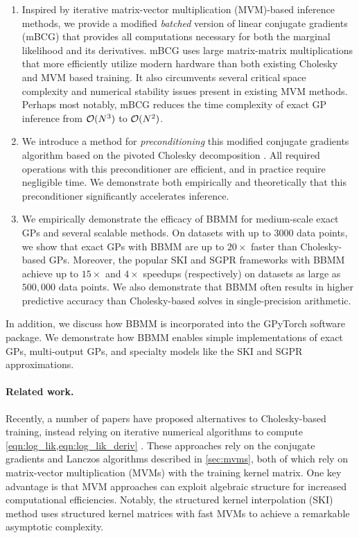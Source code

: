 \begin{enumerate}
	\item Inspired by iterative matrix-vector multiplication (MVM)-based inference methods, we provide a modified \emph{batched} version of linear conjugate gradients (mBCG) that provides all computations necessary for both the marginal likelihood and its derivatives.
		mBCG uses large matrix-matrix multiplications that more efficiently utilize modern hardware than both existing Cholesky and MVM based training.
		It also circumvents several critical space complexity and numerical stability issues present in existing MVM methods.
		Perhaps most notably, mBCG reduces the time complexity of exact GP inference from $\bigo{N^3}$ to $\bigo{N^2}$.

	\item We introduce a method for \emph{preconditioning} this modified conjugate gradients algorithm based on the pivoted Cholesky decomposition \cite{bach2013sharp,harbrecht2012low}.
		All required operations with this preconditioner are efficient, and in practice require negligible time.
		We demonstrate both empirically and theoretically that this preconditioner significantly accelerates inference.

	\item We empirically demonstrate the efficacy of BBMM for medium-scale exact GPs and several scalable methods.
		On datasets with up to $3000$ data points, we show that exact GPs with BBMM are up to $20\times$ faster than Cholesky-based GPs.
		Moreover, the popular SKI \cite{wilson2015kernel} and SGPR \cite{titsias2009variational} frameworks with BBMM achieve up to $15\times$ and $4\times$ speedups (respectively) on datasets as large as $500,\!000$ data points.
		We also demonstrate that BBMM often results in higher predictive accuracy than Cholesky-based solves in single-precision arithmetic.
\end{enumerate}
%
\noindent
In addition, we discuss how BBMM is incorporated into the GPyTorch software package.
We demonstrate how BBMM enables simple implementations of exact GPs, multi-output GPs, and specialty models like the SKI and SGPR approximations.

\paragraph{Related work.}
Recently, a number of papers have proposed alternatives to Cholesky-based training, instead relying on iterative numerical algorithms to compute \cref{eqn:log_lik,eqn:log_lik_deriv} \cite{cunningham2008fast,murray2009gaussian,saatcci2012scalable,wilson2014thesis,wilson2015kernel,cutajar2016preconditioning,dong2017scalable,gardner2018product}.
These approaches rely on the conjugate gradients and Lanczos algorithms described in \cref{sec:mvms}, both of which rely on matrix-vector multiplication (MVMs) with the training kernel matrix.
One key advantage is that MVM approaches can exploit algebraic structure for increased computational efficiencies.
Notably, the structured kernel interpolation (SKI) method \cite{wilson2015kernel} uses structured kernel matrices with fast MVMs to achieve a remarkable asymptotic complexity.

